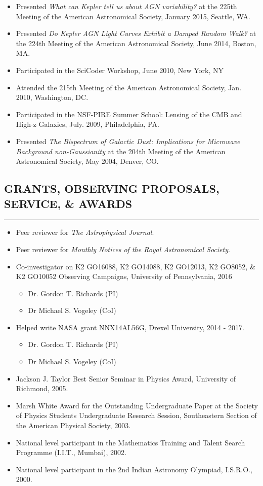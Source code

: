 \documentclass[10pt,a4]{article}
\newcounter{mySaveCounter}
\newcommand\myEnumReset{\setcounter{mySaveCounter}{0}}
\begin{document}
\begin{itemize}
    \item Presented {\it What can Kepler tell us about AGN variability?} at the 225th Meeting of the American Astronomical Society, January 2015, Seattle, WA.
    \item Presented {\it Do Kepler AGN Light Curves Exhibit a Damped Random Walk?} at the 224th Meeting of the American Astronomical Society, June 2014, Boston, MA.
    \item Participated in the SciCoder Workshop, June 2010, New York, NY
    \item Attended the 215th Meeting of the American Astronomical Society, Jan. 2010, Washington, DC.
    \item Participated in the NSF-PIRE Summer School: Lensing of the CMB and High-z Galaxies, July. 2009, Philadelphia, PA.
    \item  Presented {\it The Bispectrum of Galactic Dust: Implications for Microwave Background non-Gaussianity} at the 204th Meeting of the American Astronomical Society, May 2004, Denver, CO.
\end{itemize}
\myEnumReset

\subsection*{GRANTS, OBSERVING PROPOSALS, SERVICE, \& AWARDS}
\hrule  height 4pt
\vspace{0.2cm}
\begin{itemize}
  \item Peer reviewer for {\it The Astrophysical Journal}.
  \item Peer reviewer for {\it Monthly Notices of the Royal Astronomical Society}.
  \item Co-investigator on K2 GO16088, K2 GO14088, K2 GO12013, K2 GO8052, \& K2 GO10052 Observing Campaigns, University of Pennsylvania, 2016
    \begin{itemize}
      \item Dr. Gordon T. Richards (PI)
      \item Dr Michael S. Vogeley (CoI)
    \end{itemize}
  \item Helped write NASA grant NNX14AL56G, Drexel University, 2014 - 2017.
    \begin{itemize}
      \item Dr. Gordon T. Richards (PI)
      \item Dr Michael S. Vogeley (CoI)
    \end{itemize}
	\item Jackson J. Taylor Best Senior Seminar in Physics Award, University of Richmond, 2005.
  \item Marsh White Award for the Outstanding Undergraduate Paper at the Society of Physics Students Undergraduate Research Session, Southeastern Section of the American Physical Society, 2003.
	\item National level participant in the Mathematics Training and Talent Search Programme (I.I.T., Mumbai), 2002.
	\item National level participant in the 2nd Indian Astronomy Olympiad, I.S.R.O., 2000.
\end{itemize}
\myEnumReset
\end{document}
